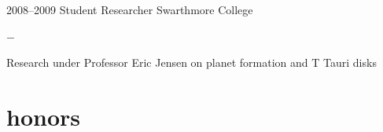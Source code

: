 \documentclass[]{luger-cv} %
\begin{document}
\begin{entrylist}

    \ifdefined \onepage \else
        \entry
        {2008--2009}
        {Student Researcher}
        {Swarthmore College}
        {%
            \vspace{-1em}
            \begin{list}{{\color{numcolor}$-$}}{\cvlist}
                \item Research under Professor Eric Jensen on planet formation and T Tauri disks
            \end{list}
        }
    \fi


\end{entrylist}




\section{honors}
\end{document}
